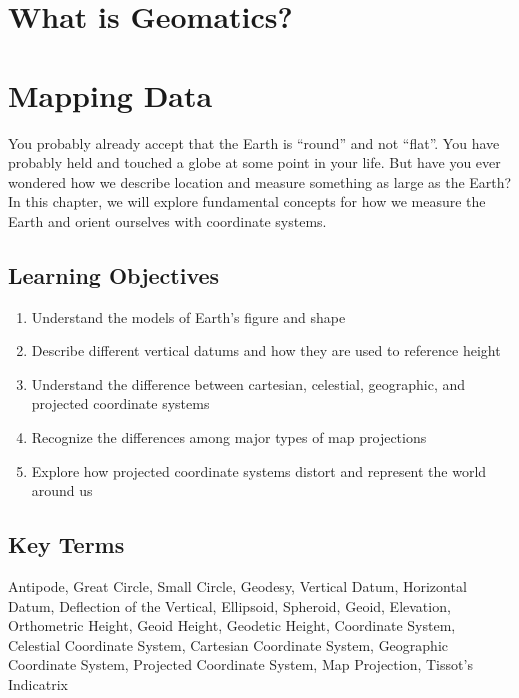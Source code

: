 \documentclass[
]{book}
\providecommand{\tightlist}{%
  \setlength{\itemsep}{0pt}\setlength{\parskip}{0pt}}
\begin{document}
\hypertarget{what-is-geomatics}{%
\chapter{What is Geomatics?}\label{what-is-geomatics}}

\hypertarget{mapping-data}{%
\chapter{Mapping Data}\label{mapping-data}}

You probably already accept that the Earth is ``round'' and not ``flat''. You have probably held and touched a globe at some point in your life. But have you ever wondered how we describe location and measure something as large as the Earth? In this chapter, we will explore fundamental concepts for how we measure the Earth and orient ourselves with coordinate systems.

\hypertarget{learning-objectives-1}{%
\section*{Learning Objectives}\label{learning-objectives-1}}

\begin{enumerate}
\def\labelenumi{\arabic{enumi}.}
\tightlist
\item
  Understand the models of Earth's figure and shape
\item
  Describe different vertical datums and how they are used to reference height
\item
  Understand the difference between cartesian, celestial, geographic, and projected coordinate systems
\item
  Recognize the differences among major types of map projections
\item
  Explore how projected coordinate systems distort and represent the world around us
\end{enumerate}

\hypertarget{key-terms-1}{%
\section*{Key Terms}\label{key-terms-1}}

Antipode, Great Circle, Small Circle, Geodesy, Vertical Datum, Horizontal Datum, Deflection of the Vertical, Ellipsoid, Spheroid, Geoid, Elevation, Orthometric Height, Geoid Height, Geodetic Height, Coordinate System, Celestial Coordinate System, Cartesian Coordinate System, Geographic Coordinate System, Projected Coordinate System, Map Projection, Tissot's Indicatrix
\end{document}
